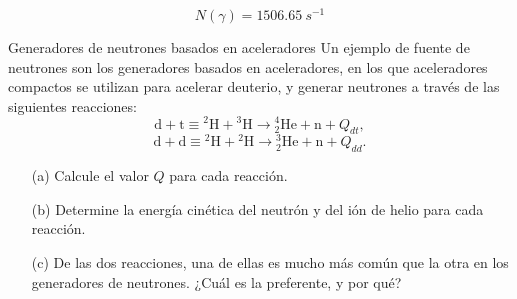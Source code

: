 \begin{equation}
    N(\gamma) = \SI{1506.65}{s^{-1}}
\end{equation}


\begin{Ejercicio}{Generadores de neutrones basados en aceleradores}\label{Ej:09}
Un ejemplo de fuente de neutrones son los generadores basados en aceleradores, en los que aceleradores compactos se utilizan para acelerar deuterio, y generar neutrones a través de las siguientes reacciones:
\[
\mathrm{d}+\mathrm{t}\equiv {}^{2}\mathrm{H}+{}^{3}\mathrm{H}\longrightarrow {}^{4}_{2}\mathrm{He}+\mathrm{n}+Q_{dt},
\]
\[
\mathrm{d}+\mathrm{d}\equiv {}^{2}\mathrm{H}+{}^{2}\mathrm{H}\longrightarrow {}^{3}_{2}\mathrm{He}+\mathrm{n}+Q_{dd}.
\]

\begin{enumerate}
\item[(a)] Calcule el valor $Q$ para cada reacción.
\item[(b)] Determine la energía cinética del neutrón y del ión de helio para cada reacción.
\item[(c)] De las dos reacciones, una de ellas es mucho más común que la otra en los generadores de neutrones. ¿Cuál es la preferente, y por qué?
\end{enumerate}
\end{Ejercicio}


